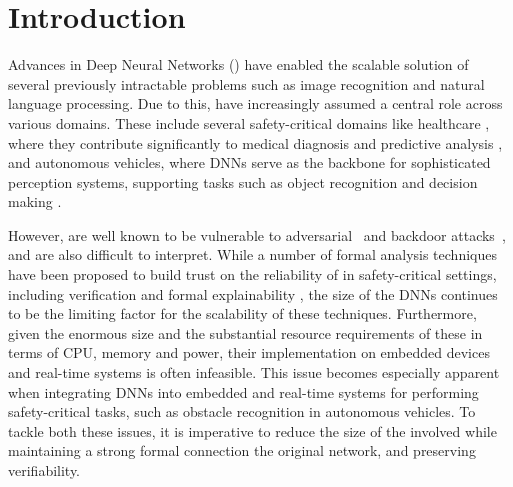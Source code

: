 
\section{Introduction}

Advances in Deep Neural Networks (\dnn) have enabled the scalable solution of
several previously intractable problems such as image recognition and natural
language processing. Due to this, \dnn have increasingly assumed a central role
across various domains. These include several safety-critical domains like
healthcare \cite{b1}, where they contribute significantly to medical
diagnosis and predictive analysis \cite{b2}, and autonomous vehicles, where
DNNs serve as the backbone for sophisticated perception systems, supporting
tasks such as object recognition and decision making \cite{b3}. 


However, \dnn are well known to be vulnerable to
adversarial~\cite{l-bfgs,fgsm,deep-fool,pgd,ground-truth-adv-attack,cw-attack}
and backdoor
attacks~\cite{backdoor-poisoning}, and are also difficult to interpret.
While a number of formal analysis techniques have been proposed to build
trust on the reliability of \dnn in safety-critical settings, including
verification \cite{reluplex,deeppoly,crown,beta-crown,cegar-nn}  and formal
explainability \cite{overview-fxai,minimal-image-fxai}, the size of the DNNs
continues to be the limiting factor for the scalability of these techniques.
Furthermore, given the enormous size and the substantial resource requirements
of these \dnn in terms of CPU, memory and power, their implementation
on embedded devices and real-time systems is often infeasible.
This issue becomes especially apparent when integrating DNNs into embedded and
real-time systems for performing safety-critical tasks, such as obstacle
recognition in autonomous vehicles. 
To tackle both these issues, it is imperative to reduce the size of the \dnn
involved while maintaining a strong formal connection the original network, and
preserving verifiability.

